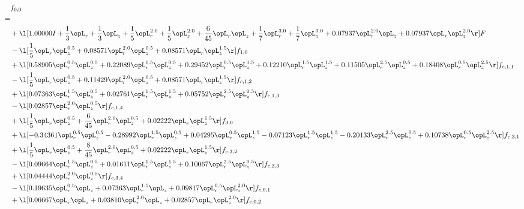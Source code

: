 \begin{alignat}{2} 
\label{eq:f_00_2} 
& f_{0,0} \nonumber \\ 
 = \\ 
& + \l[  1.00000 I + \frac{1}{3} \opL_r + \frac{1}{3} \opL_z + \frac{1}{5} \opL_r^{2.0} + \frac{1}{5} \opL_z^{2.0} + \frac{6}{45} \opL_r \opL_z + \frac{1}{7} \opL_r^{3.0} + \frac{1}{7} \opL_z^{3.0} +  0.07937 \opL_r^{2.0} \opL_z +  0.07937 \opL_r \opL_z^{2.0}  \r] F \nonumber \\ 
& - \l[ \frac{1}{5} \opL_r \opL_z^{0.5} +  0.08571 \opL_r^{2.0} \opL_z^{0.5} +  0.08571 \opL_r \opL_z^{1.5}  \r] f_{1,0} \nonumber \\ 
& + \l[  0.58905 \opL_r^{0.5} \opL_z^{0.5} +  0.22089 \opL_r^{1.5} \opL_z^{0.5} +  0.29452 \opL_r^{0.5} \opL_z^{1.5} +  0.12210 \opL_r^{1.5} \opL_z^{1.5} +  0.11505 \opL_r^{2.5} \opL_z^{0.5} +  0.18408 \opL_r^{0.5} \opL_z^{2.5}  \r] f_{c,1,1} \nonumber \\ 
& - \l[ \frac{1}{5} \opL_r \opL_z^{0.5} +  0.11429 \opL_r^{2.0} \opL_z^{0.5} +  0.08571 \opL_r \opL_z^{1.5}  \r] f_{c,1,2} \nonumber \\ 
& + \l[  0.07363 \opL_r^{1.5} \opL_z^{0.5} +  0.02761 \opL_r^{1.5} \opL_z^{1.5} +  0.05752 \opL_r^{2.5} \opL_z^{0.5}  \r] f_{c,1,3} \nonumber \\ 
& - \l[  0.02857 \opL_r^{2.0} \opL_z^{0.5}  \r] f_{c,1,4} \nonumber \\ 
& + \l[ \frac{1}{5} \opL_r \opL_z^{0.5} + \frac{6}{45} \opL_r^{2.0} \opL_z^{0.5} +  0.02222 \opL_r \opL_z^{1.5}  \r] f_{3,0} \nonumber \\ 
& + \l[  -0.34361 \opL_r^{0.5} \opL_z^{0.5}   -0.28992 \opL_r^{1.5} \opL_z^{0.5} +  0.04295 \opL_r^{0.5} \opL_z^{1.5}   -0.07123 \opL_r^{1.5} \opL_z^{1.5}   -0.20133 \opL_r^{2.5} \opL_z^{0.5} +  0.10738 \opL_r^{0.5} \opL_z^{2.5}  \r] f_{c,3,1} \nonumber \\ 
& + \l[ \frac{1}{5} \opL_r \opL_z^{0.5} + \frac{8}{45} \opL_r^{2.0} \opL_z^{0.5} +  0.02222 \opL_r \opL_z^{1.5}  \r] f_{c,3,2} \nonumber \\ 
& - \l[  0.09664 \opL_r^{1.5} \opL_z^{0.5} +  0.01611 \opL_r^{1.5} \opL_z^{1.5} +  0.10067 \opL_r^{2.5} \opL_z^{0.5}  \r] f_{c,3,3} \nonumber \\ 
& + \l[  0.04444 \opL_r^{2.0} \opL_z^{0.5}  \r] f_{c,3,4} \nonumber \\ 
& - \l[  0.19635 \opL_r^{0.5} \opL_z +  0.07363 \opL_r^{1.5} \opL_z +  0.09817 \opL_r^{0.5} \opL_z^{2.0}  \r] f_{c,0,1} \nonumber \\ 
& + \l[  0.06667 \opL_r \opL_z +  0.03810 \opL_r^{2.0} \opL_z +  0.02857 \opL_r \opL_z^{2.0}  \r] f_{c,0,2} \nonumber \\ 

\end{alignat}
